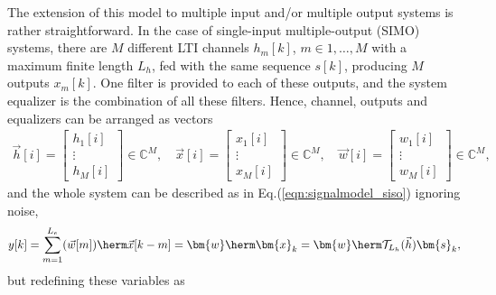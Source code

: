 The extension of this model to multiple input and/or multiple output systems is rather straightforward. In the case of single-input multiple-output (SIMO) systems, there are $M$ different LTI channels $h_m[k]$, $m\in{1,\ldots,M}$ with a maximum finite length $L_h$, fed with the same sequence $s[k]$, producing $M$ outputs $x_m[k]$. One filter is provided to each of these outputs, and the system equalizer is the combination of all these filters.  Hence, channel, outputs and equalizers can be arranged as vectors
\begin{align}
\vec{h}[i]=\begin{bmatrix}h_1[i]\\ \vdots\\ h_M[i]\end{bmatrix}\in\mathbb{C}^M,\quad \vec{x}[i]=\begin{bmatrix}x_1[i]\\ \vdots\\ x_M[i]\end{bmatrix}\in\mathbb{C}^M,\quad \vec{w}[i]=\begin{bmatrix}w_1[i]\\ \vdots\\ w_M[i]\end{bmatrix}\in\mathbb{C}^M,
\end{align}
and the whole system can be described as in Eq.(\ref{eqn:signalmodel_siso}) ignoring noise,
\begin{equation}
y[k]=\sum_{m=1}^{L_e} (\vec{w}[m])\herm\vec{x}[k-m]= \bm{w}\herm \bm{x}_k = \bm{w}\herm \mathcal{T}_{L_h}(\vec{h})\bm{s}_k, \label{eqn:signalmodel_simo}
\end{equation}
but redefining these variables as
